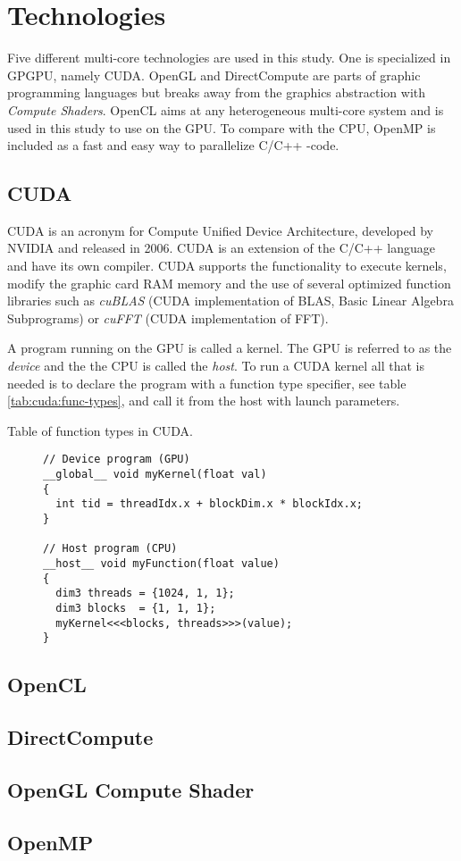 \chapter{Technologies}

Five different multi-core technologies are used in this study. One is specialized in GPGPU, namely CUDA. OpenGL and DirectCompute are parts of graphic programming languages but breaks away from the graphics abstraction with \textit{Compute Shaders}. OpenCL aims at any heterogeneous multi-core system and is used in this study to use on the GPU. To compare with the CPU, OpenMP is included as a fast and easy way to parallelize C/C++ -code.

\section{CUDA}

CUDA is an acronym for Compute Unified Device Architecture, developed by NVIDIA and released in 2006. CUDA is an extension of the C/C++ language and have its own compiler. CUDA supports the functionality to execute kernels, modify the graphic card RAM memory and the use of several optimized function libraries such as \textit{cuBLAS} (CUDA implementation of BLAS, Basic Linear Algebra Subprograms) or \textit{cuFFT} (CUDA implementation of FFT).

A program running on the GPU is called a kernel. The GPU is referred to as the \textit{device} and the the CPU is called the \textit{host}. To run a CUDA kernel all that is needed is to declare the program with a function type specifier, see table \ref{tab:cuda:func-types}, and call it from the host with launch parameters.

\begin{table}
	\centering
	\caption{Table of function types in CUDA.}
	\label{tab:cuda:func-types}
\end{table}

\begin{figure}
	\centering
	\lstset{language=C++}
	\begin{framed}
	\begin{lstlisting}
// Device program (GPU)
__global__ void myKernel(float val)
{
  int tid = threadIdx.x + blockDim.x * blockIdx.x;
}

// Host program (CPU)
__host__ void myFunction(float value)
{
  dim3 threads = {1024, 1, 1};
  dim3 blocks  = {1, 1, 1};
  myKernel<<<blocks, threads>>>(value);
}
	\end{lstlisting}
	\end{framed}
\end{figure}

\section{OpenCL}

\section{DirectCompute}

\section{OpenGL Compute Shader}

\section{OpenMP}